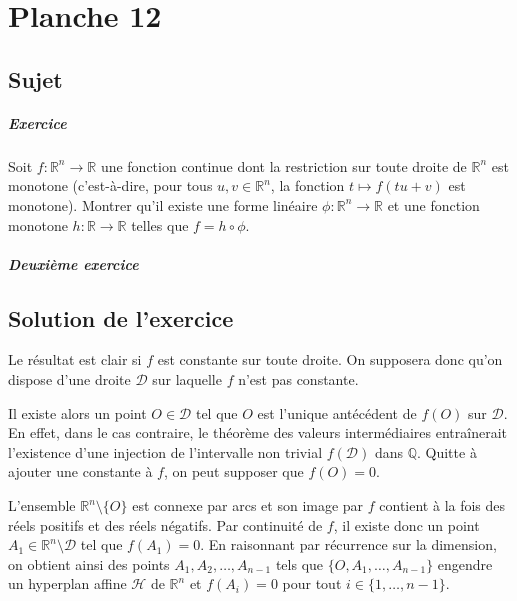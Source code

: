 \chapter{Planche 12}

\section{Sujet}

\paragraph{Exercice}
Soit $f : \mathbb R^n \to \mathbb R$ une fonction continue dont la restriction sur toute droite de $\mathbb R^n$ est monotone (c'est-à-dire, pour tous $u,v \in \mathbb R^n$, la fonction $t\mapsto f(tu+v)$ est monotone).
Montrer qu'il existe une forme linéaire $\phi : \mathbb R^n \to \mathbb R$ et une fonction monotone $h : \mathbb R \to \mathbb R$ telles que $f = h \circ \phi$.

\paragraph{Deuxième exercice}

\section{Solution de l'exercice}

Le résultat est clair si $f$ est constante sur toute droite.
On supposera donc qu'on dispose d'une droite $\mathcal D$ sur laquelle $f$ n'est pas constante.

Il existe alors un point $O \in \mathcal D$ tel que $O$ est l'unique antécédent de $f(O)$ sur $\mathcal D$. En effet, dans le cas contraire, le théorème des valeurs intermédiaires entraînerait l'existence d'une injection de l'intervalle non trivial $f(\mathcal D)$ dans $\mathbb Q$.
Quitte à ajouter une constante à $f$, on peut supposer que $f(O)=0$.

L'ensemble $\mathbb R^n \setminus\{O\}$ est connexe par arcs et son image par $f$ contient à la fois des réels positifs et des réels négatifs.
Par continuité de $f$, il existe donc un point $A_1 \in \mathbb R^n \setminus \mathcal D$ tel que $f(A_1) = 0$.
En raisonnant par récurrence sur la dimension, on obtient ainsi des points $A_1,A_2,\dots,A_{n-1}$ tels que $\{O,A_1,\dots,A_{n-1}\}$ engendre un hyperplan affine $\mathcal H$ de $\mathbb R^n$ et $f(A_i) = 0$ pour tout $i\in \{1,\dots,n-1\}$.

